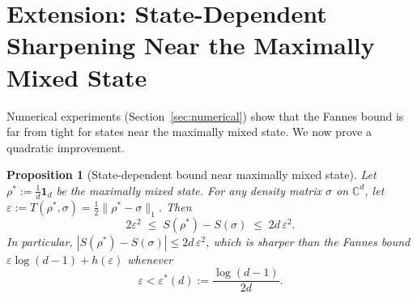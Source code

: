 \documentclass[12pt,a4paper]{article}
\newtheorem{proposition}[theorem]{Proposition}
\begin{document}
\section{Extension: State-Dependent Sharpening Near the Maximally Mixed State}

Numerical experiments (Section~\ref{sec:numerical}) show that the Fannes
bound is far from tight for states near the maximally mixed state.  We now
prove a quadratic improvement.

\begin{proposition}[State-dependent bound near maximally mixed state]
\label{prop:quadratic}
Let $\rho^* := \frac{1}{d}\mathbf{1}_d$ be the maximally mixed state.  For any
density matrix $\sigma$ on $\mathbb{C}^d$, let $\varepsilon :=
T(\rho^*,\sigma) = \frac{1}{2}\|\rho^*-\sigma\|_1$.  Then
\begin{equation}\label{eq:quadratic}
  2\varepsilon^2
  \;\leq\; S(\rho^*) - S(\sigma)
  \;\leq\; 2d\,\varepsilon^2.
\end{equation}
In particular, $|S(\rho^*)-S(\sigma)|\leq 2d\,\varepsilon^2$, which is sharper
than the Fannes bound $\varepsilon\log(d-1)+h(\varepsilon)$ whenever
\[
  \varepsilon < \varepsilon^*(d) := \frac{\log(d-1)}{2d}.
\]
\end{proposition}
\end{document}
